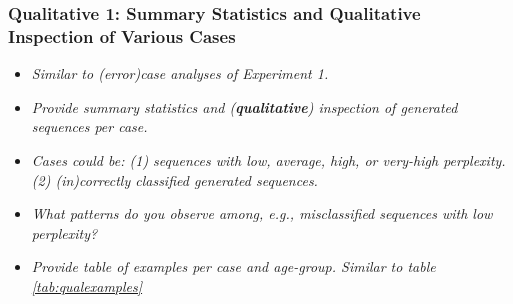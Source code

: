 \subsubsection{Qualitative 1: Summary Statistics and Qualitative Inspection of Various Cases}

\begin{itemize}
    \item \textit{Similar to (error)case analyses of Experiment 1.}
    
    \item \textit{Provide summary statistics and (\textbf{qualitative}) inspection of generated sequences per case.}
    
    \item \textit{Cases could be: (1) sequences with low, average, high, or very-high perplexity. (2) (in)correctly classified generated sequences.}
    
    \item \textit{What patterns do you observe among, e.g., misclassified sequences with low perplexity?}
    
    \item \textit{Provide table of examples per case and age-group. Similar to table \ref{tab:qualexamples}}
\end{itemize}






